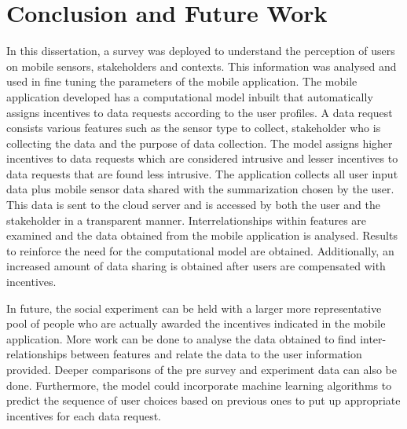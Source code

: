 \chapter{Conclusion and Future Work}

In this dissertation, a survey was deployed to understand the perception of users on mobile sensors, stakeholders and contexts. This information was analysed and used in fine tuning the parameters of the mobile application. The mobile application developed has a computational model inbuilt that automatically assigns incentives to data requests according to the user profiles. A data request consists various features such as the sensor type to collect, stakeholder who is collecting the data and the purpose of data collection. The model assigns higher incentives to data requests which are considered intrusive and lesser incentives to data requests that are found less intrusive. The application collects all user input data plus mobile sensor data shared with the summarization chosen by the user. This data is sent to the cloud server and is accessed by both the user and the stakeholder in a transparent manner. Interrelationships within features are examined and the data obtained from the mobile application is analysed. Results to reinforce the need for the computational model are obtained. Additionally, an increased amount of data sharing is obtained after users are compensated with incentives.

In future, the social experiment can be held with a larger more representative pool of people who are actually awarded the incentives indicated in the mobile application. More work can be done to analyse the data obtained to find inter-relationships between features and relate the data to the user information provided. Deeper comparisons of the pre survey and experiment data can also be done. Furthermore, the model could incorporate machine learning algorithms to predict the sequence of user choices based on previous ones to put up appropriate incentives for each data request.
